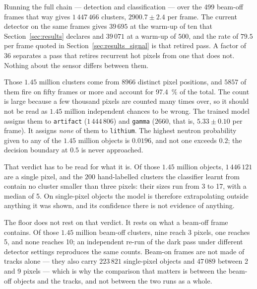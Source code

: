 \documentclass[a4paper,headsepline,oneside,11pt]{scrartcl}
\begin{document}
Running the full chain --- detection and classification --- over the 499 beam-off
frames that way gives $1\,447\,466$ clusters, $2900.7 \pm 2.4$ per frame. The
current detector on the same frames gives $39\,695$ at the warm-up of ten that
Section~\ref{sec:results} declares and $39\,071$ at a warm-up of $500$, and the
rate of $79.5$ per frame quoted in Section~\ref{sec:results_signal} is that
retired pass. A factor of $36$ separates a pass that retires recurrent hot
pixels from one that does not. Nothing about the sensor differs between them.

Those $1.45$ million clusters come from $8966$ distinct pixel positions, and
$5857$ of them fire on fifty frames or more and account for \SI{97.4}{\percent} of the
total. The count is large because a few thousand pixels are counted many times
over, so it should not be read as $1.45$ million independent chances to be
wrong. The trained model assigns them to
\texttt{artifact} ($1\,444\,806$) and \texttt{gamma} ($2660$, that is,
$5.33 \pm 0.10$ per frame). It assigns \emph{none} of them to \texttt{lithium}. The
highest neutron probability given to any of the $1.45$ million objects is
$0.0196$, and not one exceeds $0.2$; the decision boundary at $0.5$ is never
approached.

That verdict has to be read for what it is. Of those $1.45$ million objects,
$1\,446\,121$ are a single pixel, and the $200$ hand-labelled clusters the
classifier learnt from contain no cluster smaller than three pixels: their
sizes run from 3 to 17, with a median of 5. On single-pixel objects the model is
therefore extrapolating outside anything it was shown, and its confidence there
is not evidence of anything.

The floor does not rest on that verdict. It rests on what a beam-off frame
contains. Of those $1.45$ million beam-off clusters, nine reach 3 pixels, one
reaches 5, and none reaches 10; an independent re-run of the dark pass under
different detector settings reproduces the same counts. Beam-on frames are not
made of tracks alone --- they also carry $223\,821$ single-pixel objects and
$47\,089$ between 2 and 9 pixels --- which is why the comparison that matters is
between the beam-off objects and the tracks, and not between the two runs as a
whole.
\end{document}
